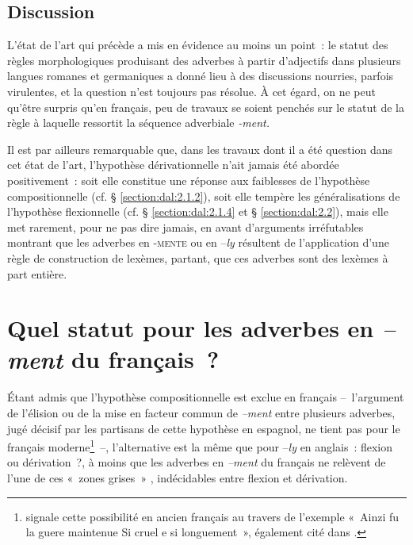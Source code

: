 \documentclass[output=paper]{langsci/langscibook}
\begin{document}
\subsection{Discussion}\label{section:dal:2.3}

L'état de l'art qui précède a mis en évidence au moins un point~: le statut des règles morphologiques produisant des adverbes à partir d'adjectifs dans plusieurs langues romanes et germaniques a donné lieu à des discussions nourries, parfois virulentes, et la question n'est toujours pas résolue. À cet égard, on ne peut qu'être surpris qu'en français, peu de travaux se soient penchés sur le statut de la règle à laquelle ressortit la séquence adverbiale \emph{-ment.}

Il est par ailleurs remarquable que, dans les travaux dont il a été question dans cet état de l'art, l'hypothèse dérivationnelle n'ait jamais été abordée positivement~: soit elle constitue une réponse aux faiblesses de l'hypothèse compositionnelle (cf. § \ref{section:dal:2.1.2}), soit elle tempère les généralisations de l'hypothèse flexionnelle (cf. § \ref{section:dal:2.1.4} et § \ref{section:dal:2.2}), mais elle met rarement, pour ne pas dire jamais, en avant d'arguments irréfutables montrant que les adverbes en -\textsc{mente} ou en --\emph{ly} résultent de l'application d'une règle de construction de lexèmes, partant, que ces adverbes sont des lexèmes à part entière.

\section{Quel statut pour les adverbes en \emph{--ment} du français~?}\label{section:dal:3}
Étant admis que l'hypothèse compositionnelle est exclue en français --~l'argument de l'élision ou de la mise en facteur commun de \emph{--ment} entre plusieurs adverbes, jugé décisif par les partisans de cette hypothèse en espagnol, ne tient pas pour le français moderne\footnote{%
\citet[638]{Meyer-Lubke} %
%
signale cette possibilité en ancien français au travers de l'exemple «~Ainzi fu la guere maintenue Si cruel e si longuement~», également cité dans %
\citet[60]{Karlsson81}%
%
.}~\mbox{--,} l'alternative est la même que pour --\emph{ly} en anglais~: flexion ou dérivation~?, à moins que les adverbes en \emph{--ment} du français ne relèvent de l'une de ces «~zones grises~» %
\citep{Bybee85}%
%
, indécidables entre flexion et dérivation.
\end{document}

